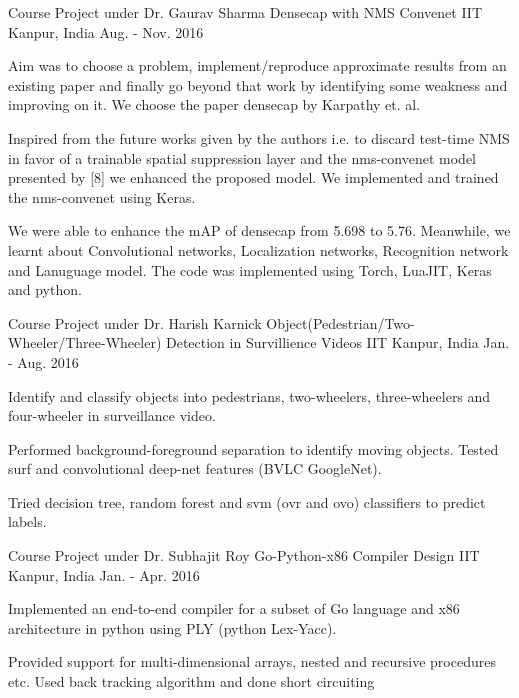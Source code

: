 \begin{cventries}
	\cventry
	{Course Project under Dr. Gaurav Sharma} %
	{Densecap with NMS Convenet} %
	{IIT Kanpur, India} %
	{Aug. - Nov. 2016} %
	{
		\begin{cvitems} %
			\item Aim was to choose a problem, implement/reproduce approximate results from an existing paper and finally go beyond that work by identifying some weakness and improving on it. We choose the paper densecap by Karpathy et. al.
			\item Inspired from the future works given by the authors i.e. to discard test-time NMS in favor of a trainable spatial suppression layer and the nms-convenet model presented by [8] we enhanced the proposed model. We implemented and trained the nms-convenet using Keras. 
			\item We were able to enhance the mAP of densecap from 5.698 to 5.76. Meanwhile, we learnt about Convolutional networks, Localization networks, Recognition network and Lanuguage model. The code was implemented using Torch, LuaJIT, Keras and python. 
		\end{cvitems}
	}
	
	
	\cventry
	{Course Project under Dr. Harish Karnick} %
	{Object(Pedestrian/Two-Wheeler/Three-Wheeler) Detection in Survillience Videos} %
	{IIT Kanpur, India} %
	{Jan. - Aug. 2016} %
	{
		\begin{cvitems} %
			\item {Identify and classify objects into pedestrians, two-wheelers, three-wheelers and four-wheeler in surveillance video.}
			\item {Performed background-foreground separation to identify moving objects. Tested surf and convolutional deep-net features (BVLC GoogleNet).}
			\item {Tried decision tree, random forest and svm (ovr and ovo) classifiers to predict labels.}
		\end{cvitems}
	}
	
	
	\cventry
	{Course Project under Dr. Subhajit Roy} %
	{Go-Python-x86 Compiler Design} %
	{IIT Kanpur, India} %
	{Jan. - Apr. 2016} %
	{
		\begin{cvitems} %
			\item Implemented an end-to-end compiler for a subset of Go language and x86 architecture in python using PLY (python Lex-Yacc).
			\item Provided support for multi-dimensional arrays, nested and recursive procedures etc. Used back tracking algorithm and done short circuiting
		\end{cvitems}
	}
	

\end{cventries}
